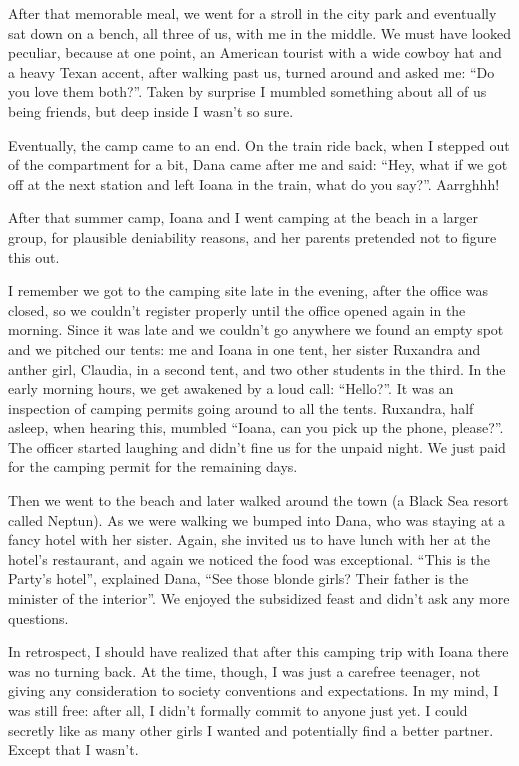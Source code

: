 \documentclass[12pt]{book}
\begin{document}
After that memorable meal, we went for a stroll in the city park and
eventually sat down on a bench, all three of us, with me in the middle.
We must have looked peculiar, because at one point, an American tourist
with a wide cowboy hat and a heavy Texan accent, after walking past us,
turned around and asked me: ``Do you love them both?''. Taken by
surprise I mumbled something about all of us being friends, but deep
inside I wasn't so sure.

Eventually, the camp came to an end. On the train ride back, when I
stepped out of the compartment for a bit, Dana came after me and said:
``Hey, what if we got off at the next station and left Ioana in the
train, what do you say?''. Aarrghhh!

After that summer camp, Ioana and I went camping at the beach in a
larger group, for plausible deniability reasons, and her parents
pretended not to figure this out.

I remember we got to the camping site late in the evening, after the
office was closed, so we couldn't register properly until the office
opened again in the morning. Since it was late and we couldn't go
anywhere we found an empty spot and we pitched our tents: me and Ioana
in one tent, her sister Ruxandra and anther girl, Claudia, in a second
tent, and two other students in the third. In the early morning hours,
we get awakened by a loud call: ``Hello?''. It was an inspection of
camping permits going around to all the tents. Ruxandra, half asleep,
when hearing this, mumbled ``Ioana, can you pick up the phone,
please?''. The officer started laughing and didn't fine us for the
unpaid night. We just paid for the camping permit for the remaining
days.

Then we went to the beach and later walked around the town (a Black Sea
resort called Neptun). As we were walking we bumped into Dana, who was
staying at a fancy hotel with her sister. Again, she invited us to have
lunch with her at the hotel's restaurant, and again we noticed the food
was exceptional. ``This is the Party's hotel'', explained Dana, ``See
those blonde girls? Their father is the minister of the interior''. We
enjoyed the subsidized feast and didn't ask any more questions.

In retrospect, I should have realized that after this camping trip with
Ioana there was no turning back. At the time, though, I was just a
carefree teenager, not giving any consideration to society conventions
and expectations. In my mind, I was still free: after all, I didn't
formally commit to anyone just yet. I could secretly like as many other
girls I wanted and potentially find a better partner. Except that I
wasn't.
\end{document}
